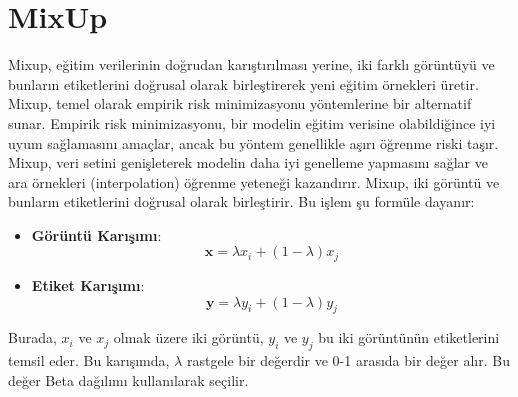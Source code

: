 \section{MixUp}

Mixup, eğitim verilerinin doğrudan karıştırılması yerine, iki farklı görüntüyü ve bunların etiketlerini doğrusal olarak birleştirerek yeni eğitim örnekleri üretir. Mixup, temel olarak empirik risk minimizasyonu yöntemlerine bir alternatif sunar. Empirik risk minimizasyonu, bir modelin eğitim verisine olabildiğince iyi uyum sağlamasını amaçlar, ancak bu yöntem genellikle aşırı öğrenme riski taşır. Mixup, veri setini genişleterek modelin daha iyi genelleme yapmasını sağlar ve ara örnekleri (interpolation) öğrenme yeteneği kazandırır. Mixup, iki görüntü ve bunların etiketlerini doğrusal olarak birleştirir. Bu işlem şu formüle dayanır:

\begin{itemize}
    \item \textbf{Görüntü Karışımı}: \[ \mathbf{x} = \lambda x_i + (1 - \lambda) x_j \]
    \item \textbf{Etiket Karışımı}: \[ \mathbf{y} = \lambda y_i + (1 - \lambda) y_j \]
\end{itemize}

Burada, $x_i$ ve $x_j$ olmak üzere iki görüntü, $y_i$ ve $y_j$ bu iki görüntünün etiketlerini temsil eder. Bu karışımda, $\lambda$ rastgele bir değerdir ve 0-1 arasıda bir değer alır. Bu değer Beta dağılımı kullanılarak seçilir.

\newpage